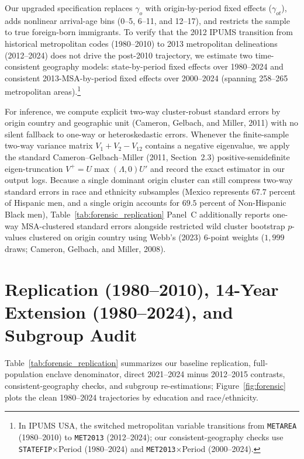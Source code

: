 \documentclass[11pt]{article}
\begin{document}
Our upgraded specification replaces $\gamma_o$ with origin-by-period fixed effects ($\gamma_{ot}$), adds nonlinear arrival-age bins (0--5, 6--11, and 12--17), and restricts the sample to true foreign-born immigrants. To verify that the 2012 IPUMS transition from historical metropolitan codes (1980--2010) to 2013 metropolitan delineations (2012--2024) does not drive the post-2010 trajectory, we estimate two time-consistent geography models: state-by-period fixed effects over 1980--2024 and consistent 2013-MSA-by-period fixed effects over 2000--2024 (spanning 258--265 metropolitan areas).\footnote{In IPUMS USA, the switched metropolitan variable transitions from \texttt{METAREA} (1980--2010) to \texttt{MET2013} (2012--2024); our consistent-geography checks use \texttt{STATEFIP}$\times$Period (1980--2024) and \texttt{MET2013}$\times$Period (2000--2024).}

For inference, we compute explicit two-way cluster-robust standard errors by origin country and geographic unit (Cameron, Gelbach, and Miller, 2011) with no silent fallback to one-way or heteroskedastic errors. Whenever the finite-sample two-way variance matrix $V_1 + V_2 - V_{12}$ contains a negative eigenvalue, we apply the standard Cameron--Gelbach--Miller (2011, Section~2.3) positive-semidefinite eigen-truncation $V^{+} = U \max(\Lambda, 0) U'$ and record the exact estimator in our output logs. Because a single dominant origin cluster can still compress two-way standard errors in race and ethnicity subsamples (Mexico represents $67.7$ percent of Hispanic men, and a single origin accounts for $69.5$ percent of Non-Hispanic Black men), Table~\ref{tab:forensic_replication} Panel~C additionally reports one-way MSA-clustered standard errors alongside restricted wild cluster bootstrap $p$-values clustered on origin country using Webb's (2023) 6-point weights ($1{,}999$ draws; Cameron, Gelbach, and Miller, 2008).

\section{Replication (1980--2010), 14-Year Extension (1980--2024), and Subgroup Audit}
Table~\ref{tab:forensic_replication} summarizes our baseline replication, full-population enclave denominator, direct 2021--2024 minus 2012--2015 contrasts, consistent-geography checks, and subgroup re-estimations; Figure~\ref{fig:forensic} plots the clean 1980--2024 trajectories by education and race/ethnicity.


\end{document}
